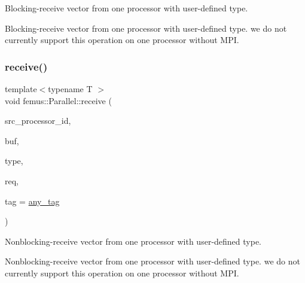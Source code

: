 Blocking-\/receive vector from one processor with user-\/defined type.

Blocking-\/receive vector from one processor with user-\/defined type. we do not currently support this operation on one processor without M\+PI. \mbox{\label{namespacefemus_1_1_parallel_a6c79d178dc5c5f64ac623f0f5a2a0ea2}} 
\subsubsection{\texorpdfstring{receive()}{receive()}\hspace{0.1cm}{\footnotesize\ttfamily [2/4]}}
{\footnotesize\ttfamily template$<$typename T $>$ \\
void femus\+::\+Parallel\+::receive (\begin{DoxyParamCaption}\item[{const int}]{src\+\_\+processor\+\_\+id,  }\item[{std\+::vector$<$ T $>$ \&}]{buf,  }\item[{const \mbox{\hyperlink{classfemus_1_1_parallel_1_1_data_type}{Data\+Type}} \&}]{type,  }\item[{\mbox{\hyperlink{structfemus_1_1_parallel_1_1request}{request}} \&}]{req,  }\item[{const int}]{tag = {\ttfamily \mbox{\hyperlink{namespacefemus_1_1_parallel_a928996065f46cb52e89e132cdcb30328}{any\+\_\+tag}}} }\end{DoxyParamCaption})\hspace{0.3cm}{\ttfamily [inline]}}

Nonblocking-\/receive vector from one processor with user-\/defined type.

Nonblocking-\/receive vector from one processor with user-\/defined type. we do not currently support this operation on one processor without M\+PI. \mbox{\label{namespacefemus_1_1_parallel_a49e65f1574362935e9c7e1d048e9aa3a}} 
